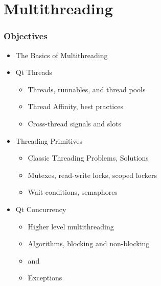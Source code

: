 %
%
%
%

\section{Multithreading}
\begin{slide}[fragile]
\frametitle{Objectives}
\begin{itemize}
\item The Basics of Multithreading
\item Qt Threads
    \begin{itemize}
    \item Threads, runnables, and thread pools
    \item Thread Affinity, best practices
    \item Cross-thread signals and slots
    \end{itemize}
\item Threading Primitives
    \begin{itemize}
    \item Classic Threading Problems, Solutions
    \item Mutexes, read-write locks, scoped lockers 
    \item Wait conditions, semaphores
    \end{itemize}
\item Qt Concurrency
    \begin{itemize}
    \item Higher level multithreading
    \item Algorithms, blocking and non-blocking
    \item {} and 
    \item Exceptions
    \end{itemize}
\end{itemize}
\end{slide}




